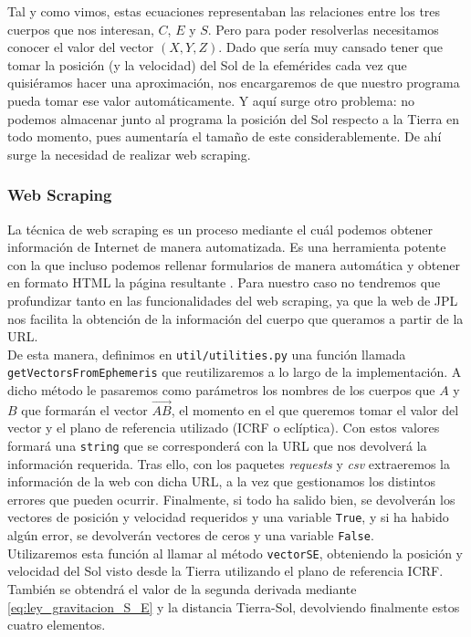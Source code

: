 \documentclass[11pt]{book}
\begin{document}
Tal y como vimos, estas ecuaciones representaban las relaciones entre los tres cuerpos que nos interesan, $C$, $E$ y $S$. Pero para poder resolverlas necesitamos conocer el valor del vector $(X,Y,Z)$. Dado que sería muy cansado tener que tomar la posición (y la velocidad) del Sol de la efemérides cada vez que quisiéramos hacer una aproximación, nos encargaremos de que nuestro programa pueda tomar ese valor automáticamente. Y aquí surge otro problema: no podemos almacenar junto al programa la posición del Sol respecto a la Tierra en todo momento, pues aumentaría el tamaño de este considerablemente. De ahí surge la necesidad de realizar web scraping.\\

\subsubsection{Web Scraping}
La técnica de web scraping es un proceso mediante el cuál podemos obtener información de Internet de manera automatizada. Es una herramienta potente con la que incluso podemos rellenar formularios de manera automática y obtener en formato HTML la página resultante \cite{webscraping}. Para nuestro caso no tendremos que profundizar tanto en las funcionalidades del web scraping, ya que la web de JPL \cite{jpl} nos facilita la obtención de la información del cuerpo que queramos a partir de la URL.\\

De esta manera, definimos en \texttt{util/utilities.py} una función llamada \texttt{getVectorsFromEphemeris} que reutilizaremos a lo largo de la implementación. A dicho método le pasaremos como parámetros los nombres de los cuerpos que $A$ y $B$ que formarán el vector $\overrightarrow{AB}$, el momento en el que queremos tomar el valor del vector y el plano de referencia utilizado (ICRF o eclíptica). Con estos valores formará una \texttt{string} que se corresponderá con la URL que nos devolverá la información requerida. Tras ello, con los paquetes \textit{requests} y \textit{csv} extraeremos la información de la web con dicha URL, a la vez que gestionamos los distintos errores que pueden ocurrir. Finalmente, si todo ha salido bien, se devolverán los vectores de posición y velocidad requeridos y una variable \texttt{True}, y si ha habido algún error, se devolverán vectores de ceros y una variable \texttt{False}.\\

Utilizaremos esta función al llamar al método \texttt{vectorSE}, obteniendo la posición y velocidad del Sol visto desde la Tierra utilizando el plano de referencia ICRF. También se obtendrá el valor de la segunda derivada mediante \eqref{eq:ley_gravitacion_S_E} y la distancia Tierra-Sol, devolviendo finalmente estos cuatro elementos.\\
\end{document}
